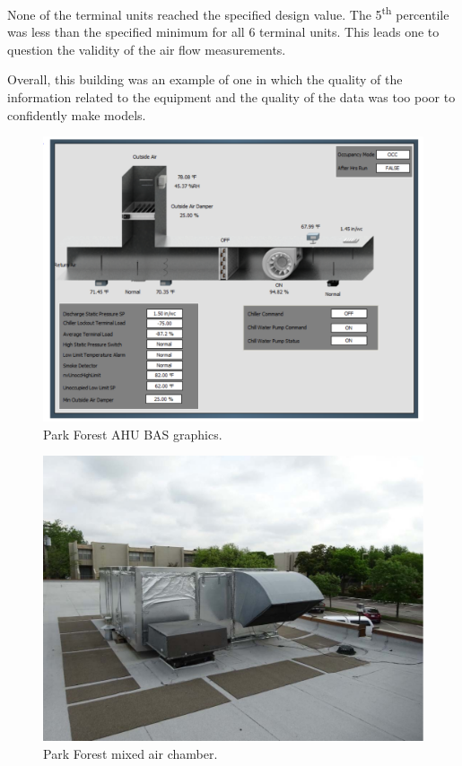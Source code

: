 None of the terminal units reached the specified design value. The
5\textsuperscript{th} percentile was less than the specified minimum for
all 6 terminal units. This leads one to question the validity of the
air flow measurements.

Overall, this building was an example of one in which the quality of the
information related to the equipment and the quality of the data was
too poor to confidently make models.

\begin{figure}
\centering
\includegraphics[width=\textwidth]{Images/ParkForestAHUGraphic.PNG}
\caption{Park Forest AHU BAS graphics.}
\label{fig:ParkForestAHUGraphic}
\end{figure}

\begin{figure}
\centering
\includegraphics[width=\textwidth]{Images/ParkForestMixedAirChamber.PNG}
\caption{Park Forest mixed air chamber.}
\label{fig:ParkForestMixedAirChamber}
\end{figure}

